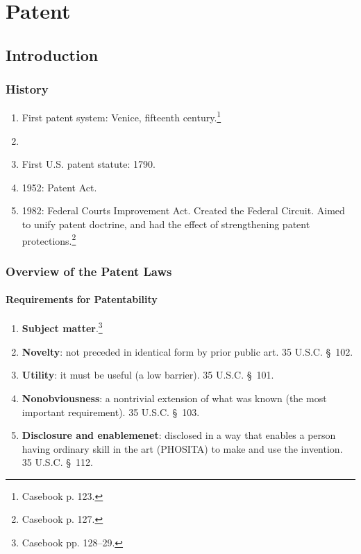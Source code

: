 \section{Patent}

\subsection{Introduction}

\subsubsection{History}

\begin{enumerate}
    \item First patent system: Venice, fifteenth century.\footnote{Casebook p. 
    123.}
    \item 
    \item First U.S. patent statute: 1790.
    \item 1952: Patent Act.
    \item 1982: Federal Courts Improvement Act. Created the Federal Circuit. 
    Aimed to unify patent doctrine, and had the effect of strengthening patent 
    protections.\footnote{Casebook p. 127.}
\end{enumerate}

\subsubsection{Overview of the Patent Laws}

\paragraph{Requirements for Patentability}

\begin{enumerate}
    \item \textbf{Subject matter}.\footnote{Casebook pp. 128--29.}
    \item \textbf{Novelty}: not preceded in identical form by prior public art. 
    35 U.S.C. \S\ 102.
    \item \textbf{Utility}: it must be useful (a low barrier). 35 U.S.C. \S\ 
    101.
    \item \textbf{Nonobviousness}: a nontrivial extension of what was known (the 
    most important requirement). 35 U.S.C. \S\ 103.
    \item \textbf{Disclosure and enablemenet}: disclosed in a way that enables a 
    person having ordinary skill in the art (PHOSITA) to make and use the 
    invention. 35 U.S.C. \S\ 112.
\end{enumerate}

